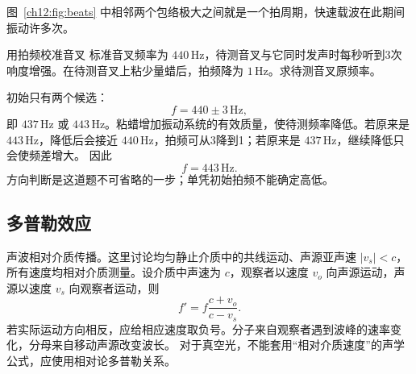 \begin{center}\begin{minipage}{\linewidth}\centering
{}
\label{ch12:fig:beats}
\end{minipage}\end{center}
图~\ref{ch12:fig:beats} 中相邻两个包络极大之间就是一个拍周期，快速载波在此期间振动许多次。

\begin{origexamplebox}{用拍频校准音叉}
\label{ch12:ex:03}
标准音叉频率为 $440\,\mathrm{Hz}$，待测音叉与它同时发声时每秒听到3次响度增强。在待测音叉上粘少量蜡后，拍频降为 $1\,\mathrm{Hz}$。求待测音叉原频率。

\ThQBeats
\end{origexamplebox}
\begin{xesolution}
\ThABeats

初始只有两个候选：
\[
 f=440\pm3\,\mathrm{Hz},
\]
即 $437\,\mathrm{Hz}$ 或 $443\,\mathrm{Hz}$。粘蜡增加振动系统的有效质量，使待测频率降低。若原来是
$443\,\mathrm{Hz}$，降低后会接近 $440\,\mathrm{Hz}$，拍频可从3降到1；若原来是 $437\,\mathrm{Hz}$，继续降低只会使频差增大。
因此
\[
 \boxed{f=443\,\mathrm{Hz}}.
\]
方向判断是这道题不可省略的一步；单凭初始拍频不能确定高低。
\end{xesolution}

\subsection{多普勒效应}

声波相对介质传播。这里讨论均匀静止介质中的共线运动、声源亚声速 $|v_s|<c$，所有速度均相对介质测量。设介质中声速为 $c$，观察者以速度 $v_o$ 向声源运动，声源以速度 $v_s$ 向观察者运动，则
\begin{equation}
 f'=f\frac{c+v_o}{c-v_s}.
\end{equation}
若实际运动方向相反，应给相应速度取负号。分子来自观察者遇到波峰的速率变化，分母来自移动声源改变波长。
对于真空光，不能套用“相对介质速度”的声学公式，应使用相对论多普勒关系。

